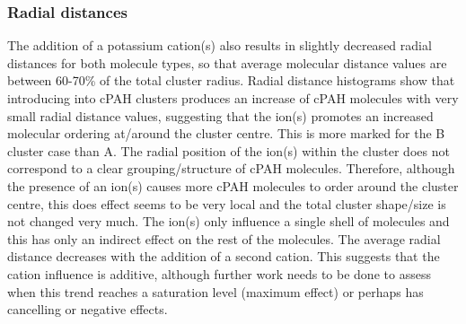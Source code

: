 \subsubsection{Radial distances} %
The addition of a potassium cation(s) also results in slightly %
decreased radial distances for both molecule types, so that average molecular distance values are between 60-70\% of the total cluster radius. Radial distance histograms show that introducing into cPAH clusters produces an increase of cPAH molecules with very small radial distance values, suggesting that the ion(s) promotes an increased molecular ordering at/around the cluster centre. This is more marked for the B cluster case than A. 
The radial position of the ion(s) within the cluster does not correspond to a clear grouping/structure of cPAH molecules. %
Therefore, although the presence of an ion(s) causes more cPAH molecules to order around the cluster centre, this does effect seems to be very local and the total cluster shape/size is not changed very much. The ion(s) only influence a single shell of molecules and this has only an indirect effect on the rest of the molecules. %
The average radial distance decreases with the addition of a second cation. %
This suggests that the cation influence is additive, although further work needs to be done to assess when this trend reaches a saturation level (maximum effect) or perhaps has cancelling or negative effects. 

